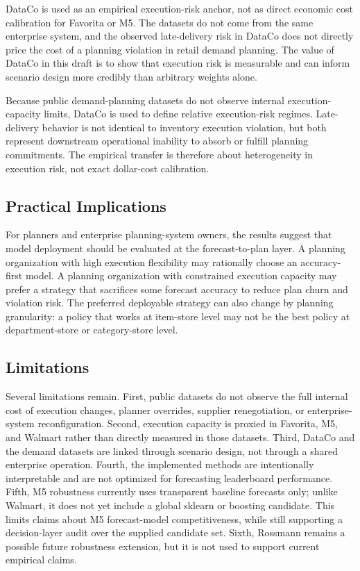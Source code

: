 DataCo is used as an empirical execution-risk anchor, not as direct economic cost calibration for Favorita or M5. The datasets do not come from the same enterprise system, and the observed late-delivery risk in DataCo does not directly price the cost of a planning violation in retail demand planning. The value of DataCo in this draft is to show that execution risk is measurable and can inform scenario design more credibly than arbitrary weights alone.

Because public demand-planning datasets do not observe internal execution-capacity limits, DataCo is used to define relative execution-risk regimes. Late-delivery behavior is not identical to inventory execution violation, but both represent downstream operational inability to absorb or fulfill planning commitments. The empirical transfer is therefore about heterogeneity in execution risk, not exact dollar-cost calibration.

\subsection{Practical Implications}

For planners and enterprise planning-system owners, the results suggest that model deployment should be evaluated at the forecast-to-plan layer. A planning organization with high execution flexibility may rationally choose an accuracy-first model. A planning organization with constrained execution capacity may prefer a strategy that sacrifices some forecast accuracy to reduce plan churn and violation risk. The preferred deployable strategy can also change by planning granularity: a policy that works at item-store level may not be the best policy at department-store or category-store level.

\subsection{Limitations}

Several limitations remain. First, public datasets do not observe the full internal cost of execution changes, planner overrides, supplier renegotiation, or enterprise-system reconfiguration. Second, execution capacity is proxied in Favorita, M5, and Walmart rather than directly measured in those datasets. Third, DataCo and the demand datasets are linked through scenario design, not through a shared enterprise operation. Fourth, the implemented methods are intentionally interpretable and are not optimized for forecasting leaderboard performance. Fifth, M5 robustness currently uses transparent baseline forecasts only; unlike Walmart, it does not yet include a global sklearn or boosting candidate. This limits claims about M5 forecast-model competitiveness, while still supporting a decision-layer audit over the supplied candidate set. Sixth, Rossmann remains a possible future robustness extension, but it is not used to support current empirical claims.

